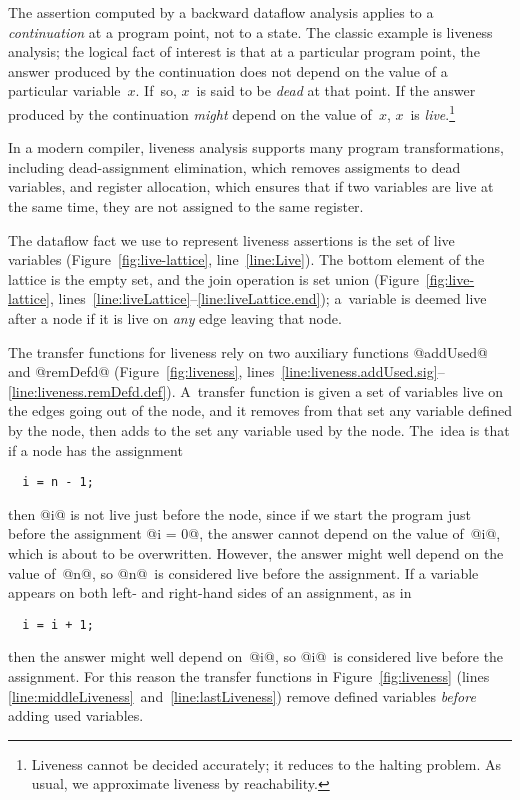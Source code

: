 \documentclass[blockstyle,preprint,natbib,nocopyrightspace]{sigplanconf}
\newcommand\lineref[1]{line~\ref{line:#1}}
\newcommand\linepairref[2]{lines \ref{line:#1}~and~\ref{line:#2}}
\newcommand\linerangeref[2]{\mbox{lines~\ref{line:#1}--\ref{line:#2}}}
\newcommand\seclabel[1]{\label{sec:#1}}
\newcommand\figref[1]{Figure~\ref{fig:#1}}
\begin{document}
\seclabel{liveness}

The assertion computed by 
a backward dataflow analysis applies to a
\emph{continuation} at a program point, not to a state.
The classic example is liveness analysis;
the logical fact of interest is that at a particular program point,
the answer produced by the continuation does not depend on
the value of a particular variable~$x$.
If~so, $x$~is said to be \emph{dead} at that point.
If the answer produced by the continuation \emph{might} depend on the
value of~$x$, $x$~is \emph{live}.\footnote
{Liveness cannot be decided accurately; it reduces to the halting problem.
As usual, we approximate liveness by reachability.}

In a modern compiler, liveness analysis supports many program
transformations,
including
dead-assignment elimination,
which removes assigments to dead variables, 
and register allocation, which
ensures that if two variables are 
live at the same time, they are not assigned to the same register. 

The dataflow fact we use to represent liveness assertions is the set of
live variables (\figref{live-lattice}, \lineref{Live}).
The bottom element of the lattice is the empty set, and the join
operation is set union (\figref{live-lattice},
\linerangeref{liveLattice}{liveLattice.end}); 
a~variable is deemed live after a node if it is live on \emph{any} edge leaving that
node.

The transfer functions for liveness rely on two auxiliary functions
@addUsed@ and @remDefd@ (\figref{liveness}, 
\linerangeref{liveness.addUsed.sig}{liveness.remDefd.def}).
A~transfer function is given a set of variables live on the edges
going out of the node, and it removes from that set any variable
defined by the node, then adds to the set any variable used by the
node.
The~idea is that if a node has the assignment
\begin{verbatim}
  i = n - 1;
\end{verbatim}
then @i@ is not live just before the node, since if we start the
program just before the assignment @i = 0@, the answer cannot 
depend on the value of~@i@, which is about to be overwritten.
However, the answer might well depend on the value of~@n@, so
@n@~is considered live before the assignment.
If a variable appears on both left- and right-hand sides of an
assignment, as in
\begin{verbatim}
  i = i + 1;
\end{verbatim}
then the answer might well depend on~@i@, so @i@~is considered live
before the assignment.
For this reason the transfer functions in \figref{liveness}
(\linepairref{middleLiveness}{lastLiveness}) 
remove defined variables \emph{before} adding used variables.
\end{document}
